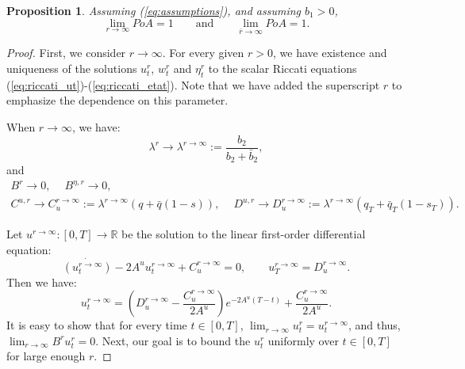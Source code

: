 \documentclass[11pt]{article}
\newtheorem{proposition}{Proposition}
\begin{document}
\begin{proposition}
	Assuming (\ref{eq:assumptions}), and assuming $b_1>0$,
	\begin{equation*}
			\lim_{r \to \infty} PoA = 1 \qquad \text{and} \qquad
			\lim_{\bar{r} \to \infty} PoA = 1.
	\end{equation*}
	\label{prop:r_bar_r}
\end{proposition}
\begin{proof}
	First, we consider $r \to \infty$. For every given $r >0$, we have existence and uniqueness of the solutions $u^{r}_t$, $w^{r}_t$ and $\eta^{r}_t$ to the scalar Riccati equations (\ref{eq:riccati_ut})-(\ref{eq:riccati_etat}). Note that we have added the superscript $r$ to emphasize the dependence on this parameter. 
	
	When $r \to \infty$, we have:
	\begin{equation*}
		\lambda^r \longrightarrow \lambda^{r\to\infty} := \frac{b_2}{b_2 + \bar{b}_2},
	\end{equation*}
	and
	\begin{equation*}
	\begin{array}{l}
		B^r \longrightarrow 0,\quad \ B^{\eta,r} \longrightarrow 0,\\
		C^{u,r} \longrightarrow C_u^{r\to \infty} := \lambda^{r \to \infty}(q + \bar{q}(1-s)),\quad \ D^{u,r} \to D_u^{r \to \infty} := \lambda^{r \to \infty}(q_T+ \bar{q}_T(1-s_T)).
	\end{array}
	\end{equation*}

	Let $u^{r \to \infty}:[0,T] \to \mathbb{R}$ be the solution to the linear first-order differential equation:
	\begin{equation}
		\dot{\left({u}^{r \to \infty}_t\right)} - 2A^u u_t^{r \to \infty} + C^{r \to \infty}_u = 0, \qquad u_T^{r \to \infty} = D^{r \to \infty}_u.
	\end{equation}
	Then we have:
	\begin{equation*}
	u_t^{r \to \infty} = \left(D^{r \to \infty}_u - \frac{C^{r \to \infty}_u}{2A^u} \right) e^{-2A^u (T-t)} +  \frac{C^{r \to \infty}_u}{2A^u}.
	\end{equation*}
	It is easy to show that for every time $t\in [0,T]$, $\lim_{r \to \infty}u^r_t=u^{r \to \infty}_t$, and thus, $\lim_{r \to \infty}B^ru^r_t=0$. Next, our goal is to bound the $u^r_t$ uniformly over $t \in [0,T]$ for large enough $r$.
	

\end{proof}
\end{document}
